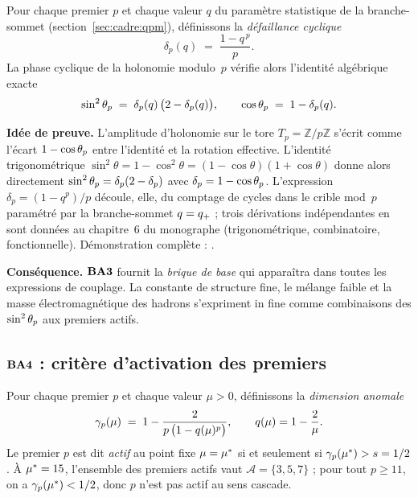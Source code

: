 \begin{theoreme}
\label{thm:BA3}
Pour chaque premier $p$ et chaque valeur $q$ du paramètre statistique de la branche-sommet (section~\ref{sec:cadre:qpm}), définissons la \emph{défaillance cyclique}
\[
\delta_p(q) \;=\; \dfrac{1 - q^{\,p}}{p}.
\]
La phase cyclique de la holonomie modulo~$p$ vérifie alors l'identité algébrique exacte
\[
\sin^{2}\theta_{p} \;=\; \delta_p(q)\,\bigl(2 - \delta_p(q)\bigr),
\qquad
\cos \theta_{p} \;=\; 1 - \delta_p(q).
\]
\end{theoreme}

\textbf{Idée de preuve.} L'amplitude d'holonomie sur le tore $T_p = \mathbb{Z}/p\mathbb{Z}$ s'écrit comme l'écart $1 - \cos\theta_{p}$ entre l'identité et la rotation effective. L'identité trigonométrique $\sin^2\theta = 1 - \cos^2\theta = (1 - \cos\theta)(1 + \cos\theta)$ donne alors directement $\sin^{2}\theta_{p} = \delta_p(2 - \delta_p)$ avec $\delta_p = 1 - \cos\theta_{p}$. L'expression $\delta_p = (1 - q^p)/p$ découle, elle, du comptage de cycles dans le crible mod~$p$ paramétré par la branche-sommet $q = q_{+}$ ; trois dérivations indépendantes en sont données au chapitre~6 du monographe (trigonométrique, combinatoire, fonctionnelle). Démonstration complète : \cite[ch.~06]{PT_Monograph}.

\textbf{Conséquence.} $\textbf{BA3}$ fournit la \emph{brique de base} qui apparaîtra dans toutes les expressions de couplage. La constante de structure fine, le mélange faible et la masse électromagnétique des hadrons s'expriment in fine comme combinaisons des $\sin^{2}\theta_{p}$ aux premiers actifs.

\subsection{\texorpdfstring{$\textbf{BA4}$}{BA4} : critère d'activation des premiers}
\label{sec:bridge:BA4}

\begin{theoreme}
\label{thm:BA4}
Pour chaque premier $p$ et chaque valeur $\mu > 0$, définissons la \emph{dimension anomale}
\[
\gamma_{p}(\mu) \;=\; 1 - \dfrac{2}{p\,\bigl(1 - q(\mu)^{p}\bigr)},
\qquad q(\mu) = 1 - \dfrac{2}{\mu}.
\]
Le premier $p$ est dit \emph{actif} au point fixe $\mu = \mu^{*}$ si et seulement si $\gamma_{p}(\mu^{*}) > s = 1/2$. À $\mu^{*} = 15$, l'ensemble des premiers actifs vaut $\mathcal A = \{3, 5, 7\}$ ; pour tout $p \geq 11$, on a $\gamma_{p}(\mu^{*}) < 1/2$, donc $p$ n'est pas actif au sens cascade.
\end{theoreme}

